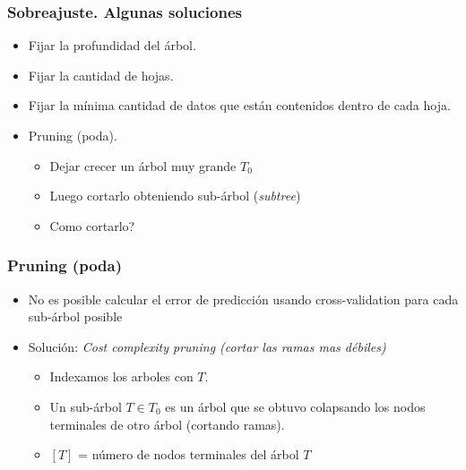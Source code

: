 \documentclass[
  shownotes,
  xcolor={svgnames},
  hyperref={colorlinks,citecolor=DarkBlue,linkcolor=andesred,urlcolor=DarkBlue}
  , aspectratio=169]{beamer}
\begin{document}
\begin{frame}[fragile]
\frametitle{Sobreajuste. Algunas soluciones}

\begin{itemize}
  \item Fijar la profundidad del árbol.
  \medskip
  \item Fijar la cantidad de hojas.
  \medskip
  \item Fijar la mínima cantidad de datos que están contenidos dentro de cada hoja. 
\medskip
\item  Pruning (poda).
\medskip
  \begin{itemize}
     \item Dejar crecer un árbol muy grande $T_0$
     \medskip
     \item Luego cortarlo obteniendo sub-árbol ({\it subtree})
     \medskip
     \item Como cortarlo? 
  \end{itemize}
\end{itemize}


\end{frame}
\begin{frame}[fragile]
\frametitle{Pruning (poda)}

\begin{itemize}
\item No es posible calcular el error de predicción usando cross-validation para cada sub-árbol posible 
\medskip
\item Solución: {\it Cost complexity pruning (cortar las ramas mas débiles)}
\medskip
\begin{itemize}
    \item Indexamos los arboles con  $T$.
    \medskip
    \item Un sub-árbol $T \in T_0$ es un árbol que se obtuvo colapsando los nodos terminales de otro árbol (cortando ramas).
    \medskip
    \item  $[T]$ = número de nodos terminales del árbol  $T$
\end{itemize}
\end{itemize}
\end{frame}
\end{document}
